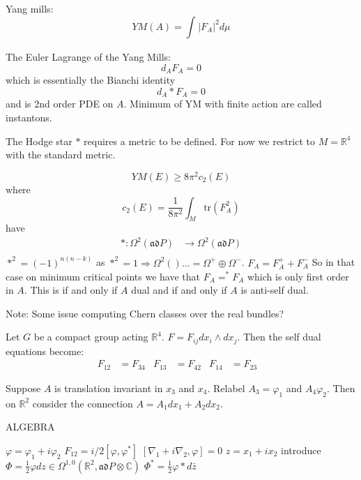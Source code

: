 Yang mills: 
\begin{equation}
    YM(A) = \int _{} | F_A | ^2 d \mu 
\end{equation}

The Euler Lagrange of the Yang Mills: 
\begin{equation}
     d_A F_A = 0 
\end{equation}
which is essentially the Bianchi identity 
\begin{equation}
    d_A * F_A = 0 
\end{equation}
and is 2nd order PDE on $A$.
Minimum of YM with finite action are called instantons.  

The Hodge star $*$ requires a metric to be defined. 
For now we restrict to $ M = \mathbb{R}  ^4 $ with the standard metric. 

\begin{equation}
    YM ( E) \geq 8 \pi ^2 c_2 (E) 
\end{equation}
where 
\begin{equation}
    c_2 (E) = \frac{1}{8 \pi^2} \int_M \mathrm{tr} (F_A ^2) 
\end{equation}
have 
\begin{align}
    * : \Omega^2(\mathfrak{ad}P) & \rightarrow  \Omega^2(\mathfrak{ad}P) \\
\end{align}
$ * ^2 = ( -1) ^{n(n-k) } $ 
as $ * ^2 = 1 \Rightarrow \Omega^2 () ... = \Omega^+ \oplus \Omega^- $. 
$ F_A = F_A ^+ + F_A ^- $ 
So in that case on minimum critical points we have that $ F_A = ^* F_A$ 
which is only first order in $A$. 
This is if and only if $A$ dual and if and only if $A$ is anti-self dual. 

Note: Some issue computing Chern classes over the real bundles?

Let $G$ be a compact group acting $ \mathbb{R} ^4$. 
$ F = F_{ij} dx_i \wedge dx_j $.
Then the self dual equations become:
\begin{align}
    F_{12} &= F_{34}  &
    F_{13} &= F_{42}  &
    F_{14} &= F_{23}  &
\end{align}

Suppose $ A $ is translation invariant in $x_3$ and $x_4$.
Relabel $ A_3 = \varphi_1 $ and $A_4 \varphi_2$.
Then on $ \mathbb{R} ^2 $ consider the connection $ A = A_1 dx_1 + A_2 dx_2 $. 

ALGEBRA

$\varphi = \varphi_1 + i \varphi_2$
$ F_{12} = i/2 [ \varphi , \varphi ^* ] $
$[ \nabla_1 + i \nabla_2 , \varphi ] = 0 $ 
$ z = x_1 + ix_2$ 
introduce 
$ \Phi = \frac{1}{2} \varphi dz \in \Omega^{1,0} ( \mathbb{R} ^2 , \mathfrak{ad}P \otimes \mathbb{C} )$
$\Phi^* = \frac{1}{2} \varphi * d\bar{z}$

